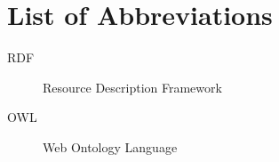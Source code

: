 \documentclass[12pt,a4paper]{report}
\newenvironment{abbrevlist}
{%
	\chapter*{List of Abbreviations}
	\newcommand\entry[2]{\item[##1] ##2}%
	\begin{description}%
	}
	{\end{description}}
\begin{document}

\makeatletter
\let\newtitle\@title
\let\newauthor\@authornew
\let\newdate\@date
\makeatother

\maketitle




\tableofcontents
\listoffigures
\listoftables


\newpage
\begin{abbrevlist}
	\entry{RDF}{Resource Description Framework}
	\entry{OWL}{Web Ontology Language}

\end{abbrevlist}














\clearpage





\end{document}
